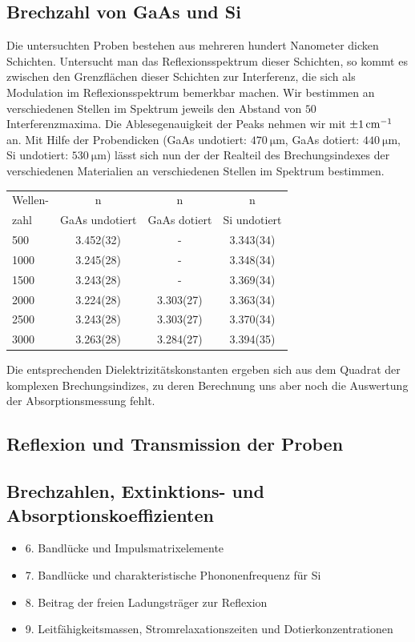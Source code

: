 \documentclass[paper=a4,fontsize=10pt,DIV=18,twocolumn,parskip=half]{scrartcl}
\numberwithin{equation}{section}    %
\begin{document}
\subsection{Brechzahl von GaAs und Si}
Die untersuchten Proben bestehen aus mehreren hundert Nanometer dicken 
Schichten.
Untersucht man das Reflexionsspektrum dieser Schichten, so kommt es zwischen den 
Grenzflächen dieser Schichten zur Interferenz, die sich als Modulation im 
Reflexionsspektrum bemerkbar machen.  Wir bestimmen an verschiedenen Stellen im 
Spektrum jeweils den Abstand von $50$ Interferenzmaxima. Die Ablesegenauigkeit 
der Peaks nehmen wir mit $\SI{\pm 1}{\centi\meter^{-1}}$ an.
Mit Hilfe der Probendicken (GaAs undotiert: $\SI{470}{\micro\meter}$, GaAs 
dotiert: $\SI{440}{\micro\meter}$, Si undotiert: $\SI{530}{\micro\meter}$) lässt 
sich nun der der Realteil des Brechungsindexes der verschiedenen Materialien an 
verschiedenen Stellen im Spektrum bestimmen.

\begin{tabular}{ l | c c c }
  Wellen- & n & n&n\\
  zahl & GaAs undotiert & GaAs dotiert & Si undotiert \\
  \hline
  500 & 3.452(32) & - & 3.343(34) \\
  1000 & 3.245(28) & - & 3.348(34) \\
  1500 & 3.243(28) & - & 3.369(34) \\
  2000 & 3.224(28) & 3.303(27) & 3.363(34) \\
  2500 & 3.243(28) & 3.303(27) & 3.370(34) \\
  3000 & 3.263(28) & 3.284(27) & 3.394(35) \\
\end{tabular}

Die entsprechenden Dielektrizitätskonstanten ergeben sich aus dem Quadrat der 
komplexen Brechungsindizes, zu deren Berechnung uns aber noch die Auswertung der 
Absorptionsmessung fehlt.

\subsection{Reflexion und Transmission der Proben}

\subsection{Brechzahlen, Extinktions- und Absorptionskoeffizienten}

\begin{itemize}
\item 6. Bandlücke und Impulsmatrixelemente
\item 7. Bandlücke und charakteristische Phononenfrequenz für Si
\item 8. Beitrag der freien Ladungsträger zur Reflexion
\item 9. Leitfähigkeitsmassen, Stromrelaxationszeiten und Dotierkonzentrationen
\end{itemize}
\end{document}
